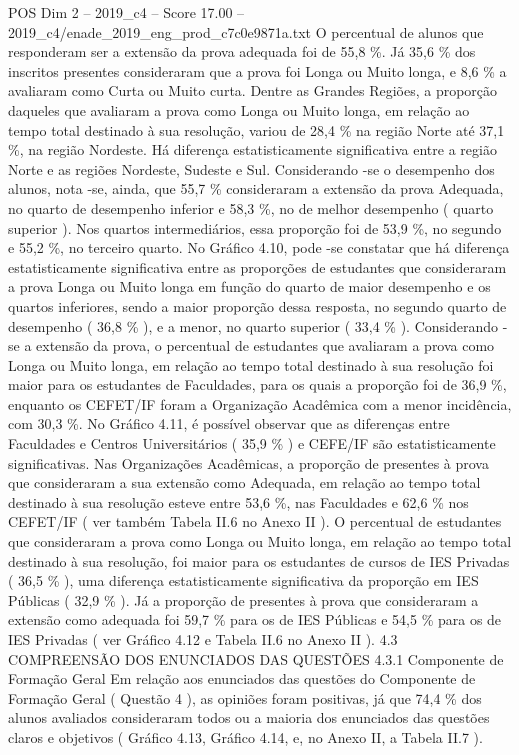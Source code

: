 \begin{textsample}{POS Dim 2 – 2019\_c4 – Score 17.00 – 2019\_c4/enade\_2019\_eng\_prod\_c7c0e9871a.txt}
O percentual de alunos que responderam ser a extensão da prova adequada foi de 55,8 \%.
Já 35,6 \% dos inscritos presentes consideraram que a prova foi Longa ou Muito longa, e 8,6 \% a avaliaram como Curta ou Muito curta.
Dentre as Grandes Regiões, a proporção daqueles que avaliaram a prova como Longa ou Muito longa, em relação ao tempo total destinado à sua resolução, variou de 28,4 \% na região Norte até 37,1 \%, na região Nordeste.
Há diferença estatisticamente significativa entre a região Norte e as regiões Nordeste, Sudeste e Sul.
Considerando -se o desempenho dos alunos, nota -se, ainda, que 55,7 \% consideraram a extensão da prova Adequada, no quarto de desempenho inferior e 58,3 \%, no de melhor desempenho ( quarto superior ).
Nos quartos intermediários, essa proporção foi de 53,9 \%, no segundo e 55,2 \%, no terceiro quarto.
No Gráfico 4.10, pode -se constatar que há diferença estatisticamente significativa entre as proporções de estudantes que consideraram a prova Longa ou Muito longa em função do quarto de maior desempenho e os quartos inferiores, sendo a maior proporção dessa resposta, no segundo quarto de desempenho ( 36,8 \% ), e a menor, no quarto superior ( 33,4 \% ).
Considerando -se a extensão da prova, o percentual de estudantes que avaliaram a prova como Longa ou Muito longa, em relação ao tempo total destinado à sua resolução foi maior para os estudantes de Faculdades, para os quais a proporção foi de 36,9 \%, enquanto os CEFET/IF foram a Organização Acadêmica com a menor incidência, com 30,3 \%.
No Gráfico 4.11, é possível observar que as diferenças entre Faculdades e Centros Universitários ( 35,9 \% ) e CEFE/IF são estatisticamente significativas.
Nas Organizações Acadêmicas, a proporção de presentes à prova que consideraram a sua extensão como Adequada, em relação ao tempo total destinado à sua resolução esteve entre 53,6 \%, nas Faculdades e 62,6 \% nos CEFET/IF ( ver também Tabela II.6 no Anexo II ).
O percentual de estudantes que consideraram a prova como Longa ou Muito longa, em relação ao tempo total destinado à sua resolução, foi maior para os estudantes de cursos de IES Privadas ( 36,5 \% ), uma diferença estatisticamente significativa da proporção em IES Públicas ( 32,9 \% ).
Já a proporção de presentes à prova que consideraram a extensão como adequada foi 59,7 \% para os de IES Públicas e 54,5 \% para os de IES Privadas ( ver Gráfico 4.12 e Tabela II.6 no Anexo II ). 4.3 COMPREENSÃO DOS ENUNCIADOS DAS QUESTÕES 4.3.1 Componente de Formação Geral Em relação aos enunciados das questões do Componente de Formação Geral ( Questão 4 ), as opiniões foram positivas, já que 74,4 \% dos alunos avaliados consideraram todos ou a maioria dos enunciados das questões claros e objetivos ( Gráfico 4.13, Gráfico 4.14, e, no Anexo II, a Tabela II.7 ).

\end{textsample}
